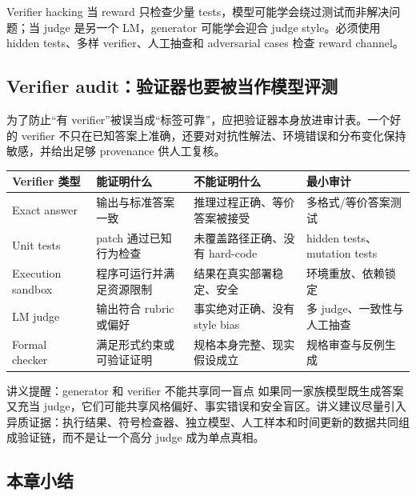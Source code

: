 \documentclass[a4paper]{article}
\begin{document}
\begin{warningbox}{Verifier hacking}
当 reward 只检查少量 tests，模型可能学会绕过测试而非解决问题；当 judge 是另一个 LM，generator 可能学会迎合 judge style。必须使用 hidden tests、多样 verifier、人工抽查和 adversarial cases 检查 reward channel。
\end{warningbox}

\subsection{Verifier audit：验证器也要被当作模型评测}

为了防止“有 verifier”被误当成“标签可靠”，应把验证器本身放进审计表。一个好的 verifier 不只在已知答案上准确，还要对对抗性解法、环境错误和分布变化保持敏感，并给出足够 provenance 供人工复核。

\begin{longtable}{L{0.19\textwidth}L{0.24\textwidth}L{0.24\textwidth}L{0.20\textwidth}}
\toprule
Verifier 类型 & 能证明什么 & 不能证明什么 & 最小审计 \\
\midrule
Exact answer & 输出与标准答案一致 & 推理过程正确、等价答案被接受 & 多格式/等价答案测试 \\
Unit tests & patch 通过已知行为检查 & 未覆盖路径正确、没有 hard-code & hidden tests、mutation tests \\
Execution sandbox & 程序可运行并满足资源限制 & 结果在真实部署稳定、安全 & 环境重放、依赖锁定 \\
LM judge & 输出符合 rubric 或偏好 & 事实绝对正确、没有 style bias & 多 judge、一致性与人工抽查 \\
Formal checker & 满足形式约束或可验证证明 & 规格本身完整、现实假设成立 & 规格审查与反例生成 \\
\bottomrule
\end{longtable}

\begin{knowledgebox}{讲义提醒：generator 和 verifier 不能共享同一盲点}
如果同一家族模型既生成答案又充当 judge，它们可能共享风格偏好、事实错误和安全盲区。讲义建议尽量引入异质证据：执行结果、符号检查器、独立模型、人工样本和时间更新的数据共同组成验证链，而不是让一个高分 judge 成为单点真相。
\end{knowledgebox}


\subsection{本章小结}
\end{document}

